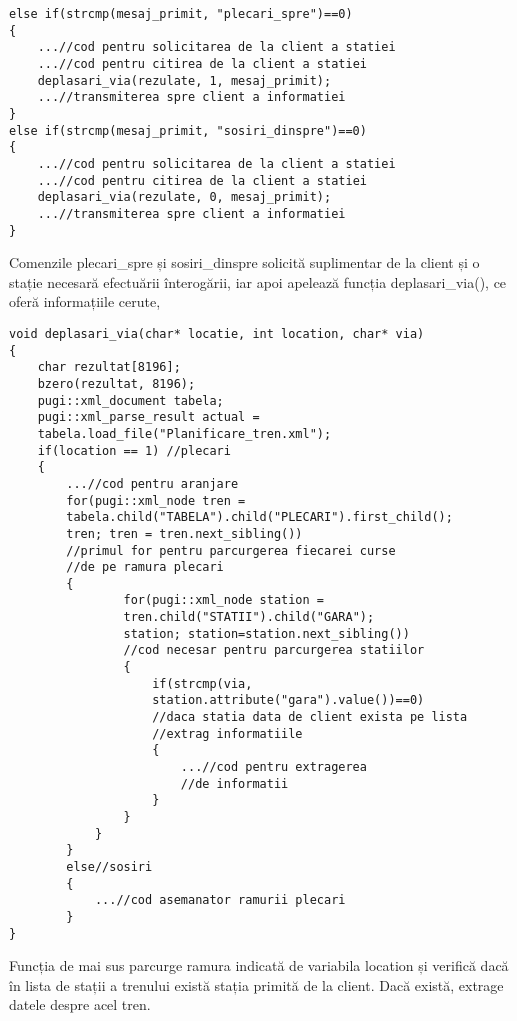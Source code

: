 \documentclass[runningheads]{llncs}
\begin{document}
\begin{verbatim}
else if(strcmp(mesaj_primit, "plecari_spre")==0)
{
    ...//cod pentru solicitarea de la client a statiei
    ...//cod pentru citirea de la client a statiei
    deplasari_via(rezulate, 1, mesaj_primit);
    ...//transmiterea spre client a informatiei
}
else if(strcmp(mesaj_primit, "sosiri_dinspre")==0)
{
    ...//cod pentru solicitarea de la client a statiei
    ...//cod pentru citirea de la client a statiei
    deplasari_via(rezulate, 0, mesaj_primit);
    ...//transmiterea spre client a informatiei
}
\end{verbatim}
Comenzile plecari\_spre și sosiri\_dinspre solicită suplimentar de la client și o stație necesară efectuării înterogării, iar apoi apelează funcția deplasari\_via(), ce oferă informațiile cerute,
\begin{verbatim}
void deplasari_via(char* locatie, int location, char* via)
{
    char rezultat[8196];
    bzero(rezultat, 8196);
    pugi::xml_document tabela;
    pugi::xml_parse_result actual =
    tabela.load_file("Planificare_tren.xml");
    if(location == 1) //plecari
    {
        ...//cod pentru aranjare
        for(pugi::xml_node tren = 
        tabela.child("TABELA").child("PLECARI").first_child(); 
        tren; tren = tren.next_sibling())
        //primul for pentru parcurgerea fiecarei curse 
        //de pe ramura plecari
        {
                for(pugi::xml_node station = 
                tren.child("STATII").child("GARA"); 
                station; station=station.next_sibling())
                //cod necesar pentru parcurgerea statiilor
                {
                    if(strcmp(via, 
                    station.attribute("gara").value())==0)
                    //daca statia data de client exista pe lista
                    //extrag informatiile
                    {
                        ...//cod pentru extragerea
                        //de informatii
                    }
                }
            }
        }
        else//sosiri
        {
            ...//cod asemanator ramurii plecari
        }
}
\end{verbatim}
Funcția de mai sus parcurge ramura indicată de variabila location și verifică dacă în lista de stații a trenului există stația primită de la client. Dacă există, extrage datele despre acel tren.
\end{document}
